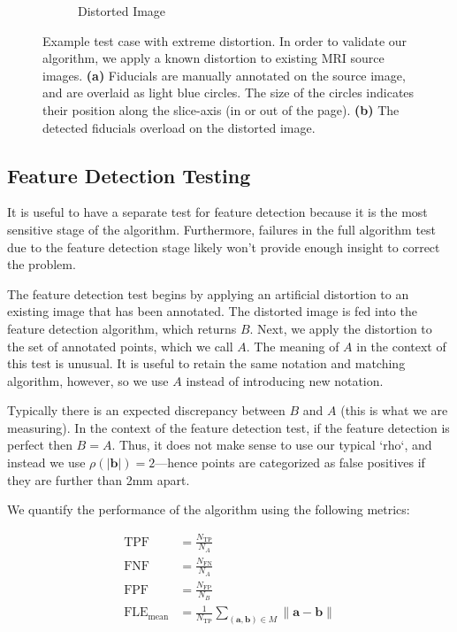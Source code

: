 \documentclass[12pt]{article}
\begin{document}
\begin{figure}
\begin{subfigure}[b]{0.48\textwidth}
        \caption{Distorted Image}
        \label{fig:test-case_2}
    \end{subfigure}
    \caption{Example test case with extreme distortion.  In order to validate our algorithm, we apply a known distortion to existing MRI source images. \textbf{(a)} Fiducials are manually annotated on the source image, and are overlaid as light blue circles.  The size of the circles indicates their position along the slice-axis (in or out of the page).  \textbf{(b)} The detected fiducials overload on the distorted image.}
    \label{fig:test-case}
\end{figure}

\subsection{Feature Detection Testing}

It is useful to have a separate test for feature detection because it is the most sensitive stage of the algorithm.  Furthermore, failures in the full algorithm test due to the feature detection stage likely won't provide enough insight to correct the problem.

The feature detection test begins by applying an artificial distortion to an existing image that has been annotated.  The distorted image is fed into the feature detection algorithm, which returns $B$.  Next, we apply the distortion to the set of annotated points, which we call $A$.  The meaning of $A$ in the context of this test is unusual.  It is useful to retain the same notation and matching algorithm, however, so we use $A$ instead of introducing new notation.

Typically there is an expected discrepancy between $B$ and $A$ (this is what we are measuring).  In the context of the feature detection test, if the feature detection is perfect then $B = A$.  Thus, it does not make sense to use our typical `rho`, and instead we use $\rho(|\mathbf{b}|) = 2$---hence points are categorized as false positives if they are further than 2mm apart.

We quantify the performance of the algorithm using the following metrics:

\begin{align*}
    \textrm{TPF} &= \frac{N_\textrm{TP}}{N_A} \\
    \textrm{FNF} &= \frac{N_\textrm{FN}}{N_A} \\
    \textrm{FPF} &= \frac{N_\textrm{FP}}{N_B} \\
    \textrm{FLE}_\textrm{mean} &= \frac{1}{N_\textrm{TP}} \sum_{(\textbf{a}, \textbf{b}) \in M} \| \textbf{a} - \textbf{b} \|\\
\end{align*}
\end{document}
